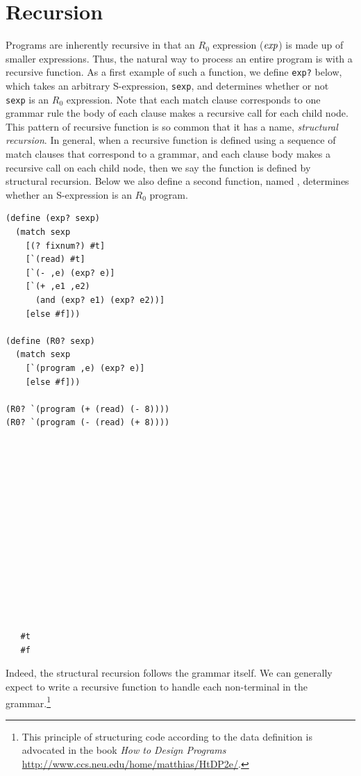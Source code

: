\documentclass[11pt]{book}
\begin{document}
\section{Recursion}
\label{sec:recursion}

Programs are inherently recursive in that an $R_0$ expression ($\mathit{exp}$)
is made up of smaller expressions. Thus, the natural way to process an
entire program is with a recursive function.  As a first example of
such a function, we define \texttt{exp?} below, which takes an
arbitrary S-expression, {\tt sexp}, and determines whether or not {\tt
  sexp} is an $R_0$ expression. Note that each match clause
corresponds to one grammar rule the body of each clause makes a
recursive call for each child node. This pattern of recursive function
is so common that it has a name, \emph{structural recursion}.  In
general, when a recursive function is defined using a sequence of
match clauses that correspond to a grammar, and each clause body makes
a recursive call on each child node, then we say the function is
defined by structural recursion. Below we also define a second
function, named , determines whether an S-expression is an
$R_0$ program.
%
\begin{center}
\begin{minipage}{0.7\textwidth}
\begin{lstlisting}
(define (exp? sexp)
  (match sexp
    [(? fixnum?) #t]
    [`(read) #t]
    [`(- ,e) (exp? e)]
    [`(+ ,e1 ,e2)
      (and (exp? e1) (exp? e2))]
    [else #f]))  

(define (R0? sexp)
  (match sexp
    [`(program ,e) (exp? e)]    
    [else #f]))

(R0? `(program (+ (read) (- 8))))
(R0? `(program (- (read) (+ 8))))
\end{lstlisting}
\end{minipage}
\vrule
\begin{minipage}{0.25\textwidth}
\begin{lstlisting}






  







   #t
   #f
\end{lstlisting}
\end{minipage}
\end{center}

Indeed, the structural recursion follows the grammar itself.  We can
generally expect to write a recursive function to handle each
non-terminal in the grammar.\footnote{This principle of structuring
  code according to the data definition is advocated in the book
  \emph{How to Design Programs}
  \url{http://www.ccs.neu.edu/home/matthias/HtDP2e/}.}
\end{document}
